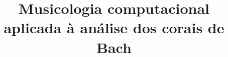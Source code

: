 \documentclass{article}
\title{Musicologia computacional aplicada à análise dos corais de
  Bach}
\author{}
\begin{document}
\graphicspath{{figs/}}

\maketitle




\end{document}
